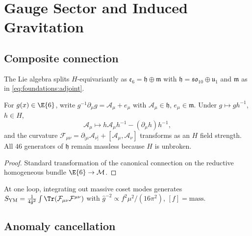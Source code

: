 \section{Gauge Sector and Induced Gravitation}
\label{sec:gauge-gravity}

\subsection{Composite connection}
\label{sec:gauge-gravity:gauge}

The Lie algebra splits $H$-equivariantly as
$\mathfrak{e}_6=\mathfrak{h}\oplus\mathfrak{m}$ with
$\mathfrak{h}=\mathfrak{so}_{10}\oplus\mathfrak{u}_1$ and $\mathfrak{m}$ as in
\eqref{eq:foundations:adjoint}.

\begin{theorem}\label{thm:gauge-gravity:composite}
For $g(x)\in\E{6}$, write $g^{-1}\partial_\mu g=\mathcal{A}_\mu+e_\mu$ with
$\mathcal{A}_\mu\in\mathfrak{h}$, $e_\mu\in\mathfrak{m}$. Under
$g\mapsto gh^{-1}$, $h\in H$,
\[
  \mathcal{A}_\mu\mapsto h\mathcal{A}_\mu h^{-1}-(\partial_\mu h)h^{-1},
\]
and the curvature $\mathcal{F}_{\mu\nu}=\partial_{[\mu}\mathcal{A}_{\nu]}+
[\mathcal{A}_\mu,\mathcal{A}_\nu]$ transforms as an $H$ field strength. All
$46$ generators of $\mathfrak{h}$ remain massless because $H$ is unbroken.
\end{theorem}

\begin{proof}
Standard transformation of the canonical connection on the reductive homogeneous
bundle $\E{6}\to\mathcal{M}$.
\end{proof}

\begin{proposition}\label{prop:gauge-gravity:ym}
At one loop, integrating out massive coset modes generates
$S_{\mathrm{YM}}=\frac{1}{4\hat g^2}\int\Tr(\mathcal{F}_{\mu\nu}\mathcal{F}^{\mu\nu})$
with $\hat g^{-2}\propto f^2\mu^2/(16\pi^2)$, $[f]=\mathrm{mass}$.
\end{proposition}

\subsection{Anomaly cancellation}
\label{sec:gauge-gravity:anomaly}

